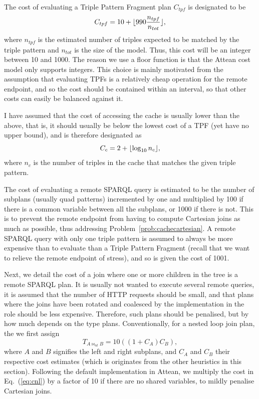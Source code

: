 The cost of evaluating a Triple Pattern Fragment plan $C_{tpf}$ is
designated to be
\begin{equation}
C_{tpf} = 10 + \lfloor 990 \frac{n_{tpf}}{n_{tot}} \rfloor ,
\end{equation}
where $n_{tpf}$ is the estimated number of triples expected to be
matched by the triple pattern and $n_{tot}$ is the size of the
model. Thus, this cost will be an integer between 10 and 1000. The
reason we use a floor function is that the Attean cost model only
supports integers. This choice is mainly motivated from the assumption
that evaluating TPFs is a relatively cheap operation for the remote
endpoint, and so the cost should be contained within an interval, so
that other costs can easily be balanced against it.

I have assumed that the cost of accessing the cache is usually
lower than the above, that is, it should usually be below the lowest cost
of a TPF (yet have no upper bound), and is therefore designated as
\begin{equation}
C_c = 2 + \lfloor \log_{10}{n_c} \rfloor , 
\end{equation}
where $n_c$ is the number of triples in the cache that matches the
given triple pattern.

The cost of evaluating a remote SPARQL query is estimated to be the
number of subplans (usually quad patterns) incremented by one and
multiplied by 100 if there is a common variable between all the
subplans, or 1000 if there is not. This is to prevent the remote
endpoint from having to compute Cartesian joins as much as possible,
thus addressing Problem~\ref{prob:cachecartesian}. A
remote SPARQL query with only one triple pattern is assumed to always
be more expensive than to evaluate than a Triple Pattern Fragment
(recall that we want to relieve the remote endpoint of stress), and so
is given the cost of 1001.


Next, we detail the cost of a join where one or more children in the
tree is a remote SPARQL plan. It is usually not wanted to execute
several remote queries, it is assumed that the number of HTTP requests
should be small, and that plans where the joins have been rotated and
coalesced by the implementation in the role  should be
less expensive. Therefore, such plans should be penalised, but by how
much depends on the type plans. Conventionally, for a nested loop join
plan, the we first assign 
\begin{equation}\label{eq:cnl}
T_{A \bowtie_{nl} B} = 10 ((1 + C_A) C_B ) ,
\end{equation}
where $A$ and $B$ signifies the left and right subplans, and $C_A$ and
$C_B$ their respective cost estimates (which is originates from the
other heuristics in this section).  Following the default
implementation in Attean, we multiply the cost in Eq.~(\ref{eq:cnl})
by a factor of 10 if there are no shared variables, to mildly penalise
Cartesian joins.

